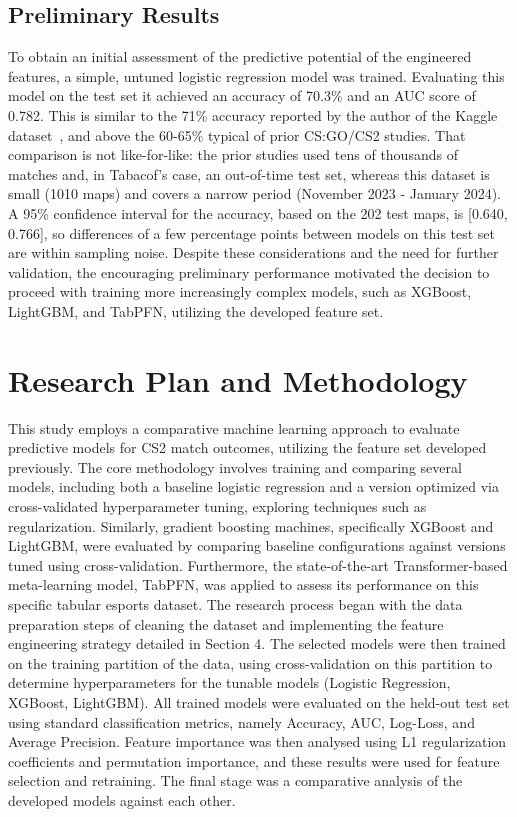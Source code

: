 \documentclass[11pt]{article}
\begin{document}
\subsection{Preliminary Results}
To obtain an initial assessment of the predictive potential of the engineered features, a simple, untuned logistic regression model was trained. Evaluating this model on the test set it achieved an accuracy of 70.3\% and an AUC score of 0.782. This is similar to the 71\% accuracy reported by the author of the Kaggle dataset~\cite{picinin2024hltv}, and above the 60-65\% typical of prior CS:GO/CS2 studies. That comparison is not like-for-like: the prior studies used tens of thousands of matches and, in Tabacof's case, an out-of-time test set, whereas this dataset is small (1010 maps) and covers a narrow period (November 2023 - January 2024). A 95\% confidence interval for the accuracy, based on the 202 test maps, is [0.640, 0.766], so differences of a few percentage points between models on this test set are within sampling noise. Despite these considerations and the need for further validation, the encouraging preliminary performance motivated the decision to proceed with training more increasingly complex models, such as XGBoost, LightGBM, and TabPFN, utilizing the developed feature set.

\section{Research Plan and Methodology}
This study employs a comparative machine learning approach to evaluate predictive models for CS2 match outcomes, utilizing the feature set developed previously. The core methodology involves training and comparing several models, including both a baseline logistic regression and a version optimized via cross-validated hyperparameter tuning, exploring techniques such as regularization. Similarly, gradient boosting machines, specifically XGBoost and LightGBM, were evaluated by comparing baseline configurations against versions tuned using cross-validation. Furthermore, the state-of-the-art Transformer-based meta-learning model, TabPFN, was applied to assess its performance on this specific tabular esports dataset. The research process began with the data preparation steps of cleaning the dataset and implementing the feature engineering strategy detailed in Section 4. The selected models were then trained on the training partition of the data, using cross-validation on this partition to determine hyperparameters for the tunable models (Logistic Regression, XGBoost, LightGBM). All trained models were evaluated on the held-out test set using standard classification metrics, namely Accuracy, AUC, Log-Loss, and Average Precision. Feature importance was then analysed using L1 regularization coefficients and permutation importance, and these results were used for feature selection and retraining. The final stage was a comparative analysis of the developed models against each other.
\end{document}
